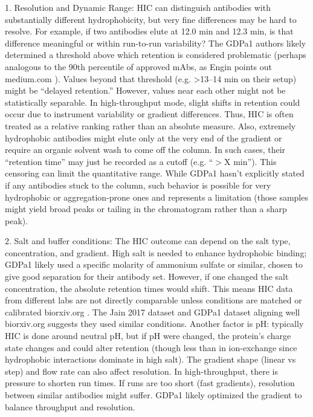 \documentclass[12pt]{article}
\begin{document}
1. Resolution and Dynamic Range: HIC can distinguish antibodies with substantially different hydrophobicity, but very fine differences may be hard to resolve. For example, if two antibodies elute at 12.0 min and 12.3 min, is that difference meaningful or within run-to-run variability? The GDPa1 authors likely determined a threshold above which retention is considered problematic (perhaps analogous to the 90th percentile of approved mAbs, as Engin points out
medium.com
). Values beyond that threshold (e.g. >13–14 min on their setup) might be “delayed retention.” However, values near each other might not be statistically separable. In high-throughput mode, slight shifts in retention could occur due to instrument variability or gradient differences. Thus, HIC is often treated as a relative ranking rather than an absolute measure. Also, extremely hydrophobic antibodies might elute only at the very end of the gradient or require an organic solvent wash to come off the column. In such cases, their “retention time” may just be recorded as a cutoff (e.g. “$>$X min”). This censoring can limit the quantitative range. While GDPa1 hasn’t explicitly stated if any antibodies stuck to the column, such behavior is possible for very hydrophobic or aggregation-prone ones and represents a limitation (those samples might yield broad peaks or tailing in the chromatogram rather than a sharp peak).

2. Salt and buffer conditions: The HIC outcome can depend on the salt type, concentration, and gradient. High salt is needed to enhance hydrophobic binding; GDPa1 likely used a specific molarity of ammonium sulfate or similar, chosen to give good separation for their antibody set. However, if one changed the salt concentration, the absolute retention times would shift. This means HIC data from different labs are not directly comparable unless conditions are matched or calibrated
biorxiv.org
. The Jain 2017 dataset and GDPa1 dataset aligning well
biorxiv.org
 suggests they used similar conditions. Another factor is pH: typically HIC is done around neutral pH, but if pH were changed, the protein’s charge state changes and could alter retention (though less than in ion-exchange since hydrophobic interactions dominate in high salt). The gradient shape (linear vs step) and flow rate can also affect resolution. In high-throughput, there is pressure to shorten run times. If runs are too short (fast gradients), resolution between similar antibodies might suffer. GDPa1 likely optimized the gradient to balance throughput and resolution.
\end{document}
